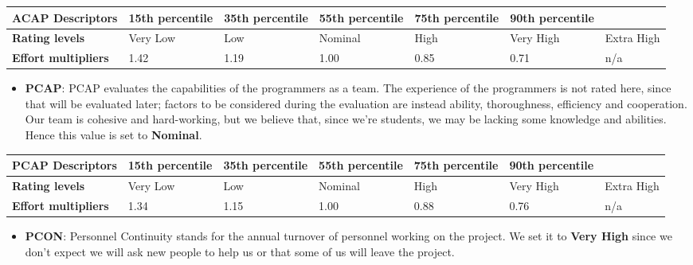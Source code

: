 		\begin{center}
			\begin{tabular}{ | C{2cm} | C{2cm} | C{2cm} | C{2cm} | C{2cm} | C{2cm} | C{2cm} | }
				\hline
				\textbf{ACAP Descriptors} & 15th percentile & 35th percentile & 55th percentile & 75th percentile & 90th percentile & \\ \hline
			
				\textbf{Rating levels} & Very Low & Low & Nominal & High & Very High & Extra High\\ \hline
			
				\textbf{Effort multipliers} & 1.42 & 1.19 & 1.00 & 0.85 & 0.71 & n/a\\ \hline
			\end{tabular}
		\end{center}
		
		
		
		
		\begin{itemize}
			\item \textbf{PCAP}: PCAP evaluates the capabilities of the programmers as a team. The experience of the programmers is not rated here, since that will be evaluated later; factors to be considered during the evaluation are instead ability, thoroughness, efficiency and cooperation. Our team is cohesive and hard-working, but we believe that, since we're students, we may be lacking some knowledge and abilities. Hence this value is set to \textbf{Nominal}.
		\end{itemize}
		
		\begin{center}
			\begin{tabular}{ | C{2cm} | C{2cm} | C{2cm} | C{2cm} | C{2cm} | C{2cm} | C{2cm} | }
				\hline
				\textbf{PCAP Descriptors} & 15th percentile & 35th percentile & 55th percentile & 75th percentile & 90th percentile & \\ \hline
			
				\textbf{Rating levels} & Very Low & Low & Nominal & High & Very High & Extra High\\ \hline
			
				\textbf{Effort multipliers} & 1.34 & 1.15 & 1.00 & 0.88 & 0.76 & n/a\\ \hline
			\end{tabular}
		\end{center}
		
		
		
		
		\begin{itemize}
			\item \textbf{PCON}: Personnel Continuity stands for the annual turnover of personnel working on the project. We set it to \textbf{Very High} since we don't expect we will ask new people to help us or that some of us will leave the project.
		\end{itemize}
		
